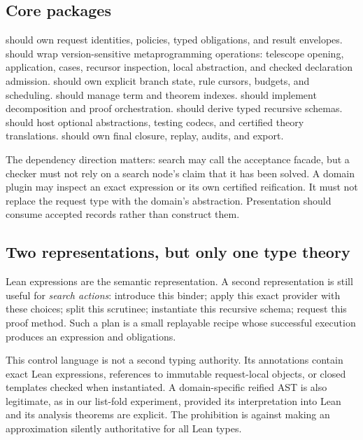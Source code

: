 \subsection{Core packages}

 should own request identities, policies, typed obligations,
and result envelopes.  should wrap version-sensitive
metaprogramming operations: telescope opening, application, cases, recursor
inspection, local abstraction, and checked declaration admission.
 should own explicit branch state, rule cursors, budgets,
and scheduling.  should manage term and theorem indexes.
 should implement decomposition and proof orchestration.
 should derive typed recursive schemas.
 should host optional abstractions, testing codecs, and
certified theory translations.  should own final closure,
replay, audits, and export.

The dependency direction matters: search may call the acceptance facade, but a
checker must not rely on a search node's claim that it has been solved. A domain
plugin may inspect an exact expression or its own certified reification. It
must not replace the request type with the domain's abstraction. Presentation
should consume accepted records rather than construct them.

\subsection{Two representations, but only one type theory}

Lean expressions are the semantic representation. A second representation is
still useful for \emph{search actions}: introduce this binder; apply this exact
provider with these choices; split this scrutinee; instantiate this recursive
schema; request this proof method. Such a plan is a small replayable recipe
whose successful execution produces an expression and obligations.

This control language is not a second typing authority. Its annotations contain
exact Lean expressions, references to immutable request-local objects, or
closed templates checked when instantiated. A domain-specific reified AST is
also legitimate, as in our list-fold experiment, provided its interpretation
into Lean and its analysis theorems are explicit. The prohibition is against
making an approximation silently authoritative for all Lean types.

